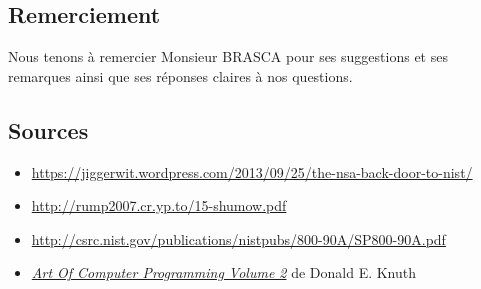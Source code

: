 \documentclass[a4paper,11pt]{report}
\begin{document}
	\subsection{Remerciement}
	Nous tenons \`a remercier Monsieur BRASCA pour ses suggestions et ses remarques ainsi que ses %
	r\'eponses claires \`a nos questions.	
	
	\subsection{Sources}
	\begin{itemize}
	\item \url{https://jiggerwit.wordpress.com/2013/09/25/the-nsa-back-door-to-nist/}
	\item \url{http://rump2007.cr.yp.to/15-shumow.pdf}
	\item \url{http://csrc.nist.gov/publications/nistpubs/800-90A/SP800-90A.pdf}
	\item \textit{\underline{Art Of Computer Programming Volume 2}} de Donald E. Knuth  
	\end{itemize}	   	 
	 
	 
	 
	 
	 
	 
	 
	 
	 
	 
	 
	 
	 
	 
	 
\end{document}
